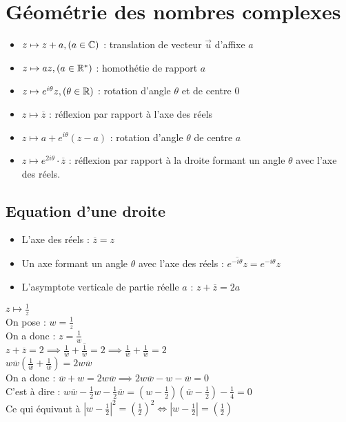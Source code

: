 \section{Géométrie des nombres complexes}
\begin{itemize}
    \item $z \mapsto z + a, (a \in \mathbb{C})$ : translation de vecteur $\vec{u}$ d'affixe $a$
    \item $z \mapsto az, (a \in \mathbb{R}^*)$ : homothétie de rapport $a$
    \item $z \mapsto e^{i\theta}z, (\theta \in \mathbb{R})$ : rotation d'angle $\theta$ et de centre $0$
    \item $z \mapsto \overline{z}$ : réflexion par rapport à l'axe des réels
    \item $z \mapsto a + e^{i\theta} (z - a)$ : rotation d'angle $\theta$ de centre $a$
    \item $z \mapsto e^{2i\theta} \cdot \overline{z}$ : réflexion par rapport à la droite formant un angle $\theta$ avec l'axe des réels.
\end{itemize}

\subsection{Equation d'une droite}
\begin{itemize}
    \item L'axe des réels : $\overline{z} = z$
    \item Un axe formant un angle $\theta$ avec l'axe des réels : $\overline{e^{-i\theta}z}= e^{-i\theta}z$
    \item L'asymptote verticale de partie réelle $a$ : $z + \overline{z} = 2a$
\end{itemize}

\begin{leftstroke}
\begin{exemple}
    $z \mapsto \frac{1}{z}$ 
    \\
    On pose : $w = \frac{1}{z}$
    \\
    On a donc : $z = \frac{1}{w}$
    \\
    $z + \overline{z} = 2 \implies \frac{1}{w} + \overline{\frac{1}{w}} = 2 \implies \frac{1}{w} + \frac{1}{\overline{w}} = 2$ \\
    $w\overline{w} \left( \frac{1}{w} + \frac{1}{\overline{w}} \right) = 2w\overline{w}$
    \\
    On a donc : $\overline{w} + w = 2w\overline{w} \implies 2w\overline{w} - w - \overline{w} = 0$ 
    \\
    C'est à dire : $w\overline{w} - \frac{1}{2}w - \frac{1}{2}\overline{w} = \left( w - \frac{1}{2} \right) \left( \overline{w} - \frac{1}{2} \right) - \frac{1}{4} = 0$
    \\
    Ce qui équivaut à $\left| w - \frac{1}{2} \right|^2 = \left( \frac{1}{2} \right)^2 \iff \left|w - \frac{1}{2}\right| = \left(\frac{1}{2}\right)$
\end{exemple}
\end{leftstroke}

